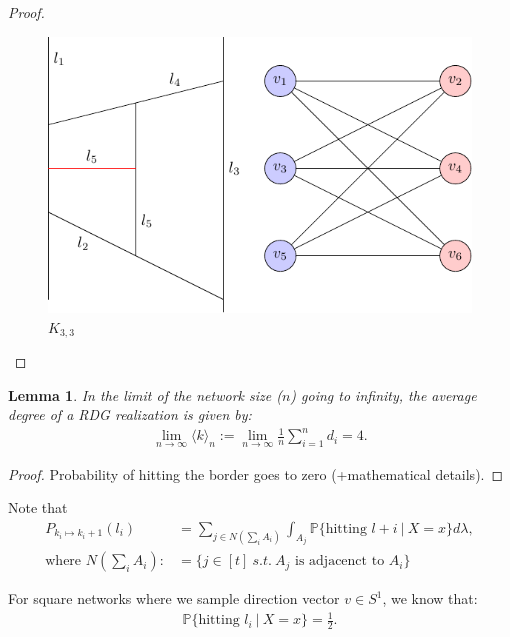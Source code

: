 \documentclass{article}
\newtheorem{lemma}{Lemma}
\theoremstyle{definition}
\theoremstyle{remark}
\begin{document}
\begin{proof}
    \begin{figure}
        \centering
        \includegraphics{Figures/K33.pdf}
        \caption{$K_{3,3}$}
        \label{fig:Planar_Proof_K33}
    \end{figure}
    
\end{proof}

\begin{lemma}
    In the limit of the network size ($n$) going to infinity, the average degree of a RDG realization is given by:
    \begin{align}
        \lim_{n \to \infty} \langle k \rangle_{n} := \lim_{n \to \infty} \frac{1}{n} \sum_{i=1}^{n} d_i = 4.
    \end{align}
\end{lemma}
\begin{proof}
    Probability of hitting the border goes to zero (+mathematical details).
\end{proof}


Note that
\begin{align}
    P_{k_i\mapsto k_i+1}(l_i) &= \sum_{j \in N(\sum_{i}A_i)} \int_{A_j} \mathbb{P}\{ \text{hitting } l+i \ | \ X=x \} d\lambda, \label{eq:general} \\
    \text{where } N \left(\sum_{i}A_i \right) :&= \bigg\{ j \in [t] \ s.t. \ A_j \text{ is adjacenct to } A_i \bigg\}
\end{align}

For square networks where we sample direction vector $v \in S^{1}$, we know that:
\begin{align}
    \mathbb{P}\{ \text{hitting } l_i \ | \ X=x \} = \frac{1}{2}.
\end{align}
\end{document}
